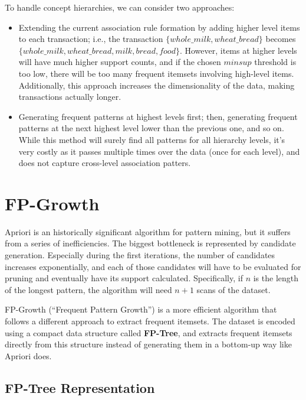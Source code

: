 To handle concept hierarchies, we can consider two approaches:
\begin{itemize}
    \item Extending the current association rule formation by adding higher level items to each transaction; i.e., the transaction $\{ whole\_milk, wheat\_bread \}$ becomes $\{ whole\_milk, wheat\_bread, milk, bread, food \}$. However, items at higher levels will have much higher support counts, and if the chosen $minsup$ threshold is too low, there will be too many frequent itemsets involving high-level items. Additionally, this approach increases the dimensionality of the data, making transactions actually longer.

    \item Generating frequent patterns at highest levels first; then, generating frequent patterns at the next highest level lower than the previous one, and so on. While this method will surely find all patterns for all hierarchy levels, it's very costly as it passes multiple times over the data (once for each level), and does not capture cross-level association patters. 
\end{itemize}

\section{FP-Growth}

Apriori is an historically significant algorithm for pattern mining, but it suffers from a series of inefficiencies. The biggest bottleneck is represented by candidate generation. Especially during the first iterations, the number of candidates increases exponentially, and each of those candidates will have to be evaluated for pruning and eventually have its support calculated. Specifically, if $n$ is the length of the longest pattern, the algorithm will need $n+1$ scans of the dataset.

FP-Growth (``Frequent Pattern Growth'') is a more efficient algorithm that follows a different approach to extract frequent itemsets. The dataset is encoded using a compact data structure called \textbf{FP-Tree}, and extracts frequent itemsets directly from this structure instead of generating them in a bottom-up way like Apriori does.

\subsection{FP-Tree Representation}


